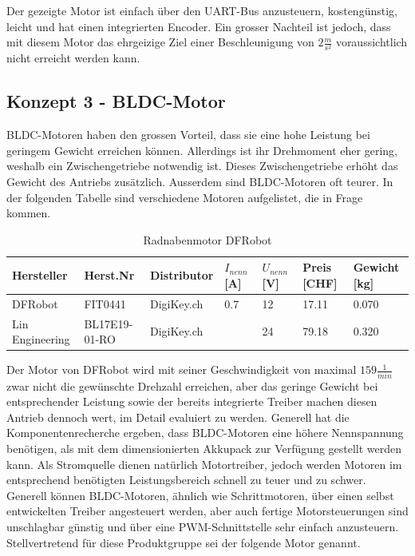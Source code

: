 \documentclass[main.  tex]{subfiles} %
\begin{document}
Der gezeigte Motor ist einfach über den UART-Bus anzusteuern, kostengünstig,
leicht und hat einen integrierten Encoder. Ein grosser Nachteil ist jedoch,
dass mit diesem Motor das ehrgeizige Ziel einer Beschleunigung von $2
    \frac{m}{s^2}$ voraussichtlich nicht erreicht werden kann.

\subsection*{Konzept 3 - BLDC-Motor} %

BLDC-Motoren haben den grossen Vorteil, dass sie eine hohe Leistung bei
geringem Gewicht erreichen können. Allerdings ist ihr Drehmoment eher gering,
weshalb ein Zwischengetriebe notwendig ist. Dieses Zwischengetriebe erhöht das
Gewicht des Antriebs zusätzlich. Ausserdem sind BLDC-Motoren oft teurer. In der
folgenden Tabelle sind verschiedene Motoren aufgelistet, die in Frage kommen.

\begin{table}[h]
    \centering
    \begin{tabular}{|p{2cm}|p{3cm}|p{2cm}|p{1cm}|p{1cm}|p{1cm}|p{1.5cm}|}
        \hline
        Hersteller      & Herst.Nr      & Distributor & $I_{nenn} $ [A] & $U_{nenn}$ [V] & Preis [CHF] & Gewicht [kg] \\ \hline
        DFRobot         & FIT0441       & DigiKey.ch  & 0.7             & 12             & 17.11       & 0.070        \\ \hline
        Lin Engineering & BL17E19-01-RO & DigiKey.ch  &                 & 24             & 79.18       & 0.320        \\ \hline
    \end{tabular}
    \caption{Radnabenmotor DFRobot}
\end{table}

Der Motor von DFRobot wird mit seiner Geschwindigkeit von maximal $159
    \frac{1}{min}$ zwar nicht die gewünschte Drehzahl erreichen, aber das geringe
Gewicht bei entsprechender Leistung sowie der bereits integrierte Treiber
machen diesen Antrieb dennoch wert, im Detail evaluiert zu werden. Generell hat
die Komponentenrecherche ergeben, dass BLDC-Motoren eine höhere Nennspannung
benötigen, als mit dem dimensionierten Akkupack zur Verfügung gestellt werden
kann. Als Stromquelle dienen natürlich Motortreiber, jedoch werden Motoren im
entsprechend benötigten Leistungsbereich schnell zu teuer und zu schwer.
Generell können BLDC-Motoren, ähnlich wie Schrittmotoren, über einen selbst
entwickelten Treiber angesteuert werden, aber auch fertige Motorsteuerungen
sind unschlagbar günstig und über eine PWM-Schnittstelle sehr einfach
anzusteuern. Stellvertretend für diese Produktgruppe sei der folgende Motor
genannt.
\end{document}
